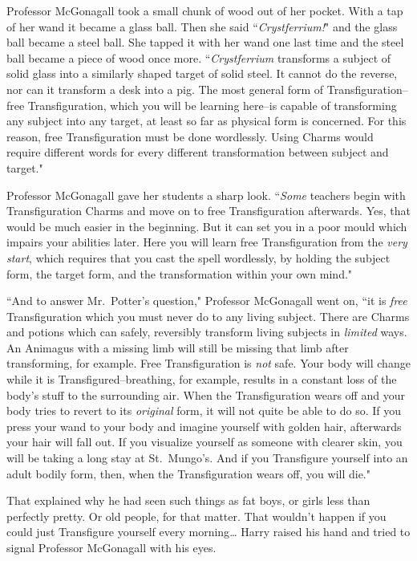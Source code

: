 Professor McGonagall took a small chunk of wood out of her pocket. With a tap of her wand it became a glass ball. Then she said ``\emph{Crystferrium!}" and the glass ball became a steel ball. She tapped it with her wand one last time and the steel ball became a piece of wood once more. ``\emph{Crystferrium} transforms a subject of solid glass into a similarly shaped target of solid steel. It cannot do the reverse, nor can it transform a desk into a pig. The most general form of Transfiguration\---free Transfiguration, which you will be learning here\---is capable of transforming any subject into any target, at least so far as physical form is concerned. For this reason, free Transfiguration must be done wordlessly. Using Charms would require different words for every different transformation between subject and target."

Professor McGonagall gave her students a sharp look. ``\emph{Some} teachers begin with Transfiguration Charms and move on to free Transfiguration afterwards. Yes, that would be much easier in the beginning. But it can set you in a poor mould which impairs your abilities later. Here you will learn free Transfiguration from the \emph{very start}, which requires that you cast the spell wordlessly, by holding the subject form, the target form, and the transformation within your own mind."

``And to answer Mr.~Potter's question," Professor McGonagall went on, ``it is \emph{free} Transfiguration which you must never do to any living subject. There are Charms and potions which can safely, reversibly transform living subjects in \emph{limited} ways. An Animagus with a missing limb will still be missing that limb after transforming, for example. Free Transfiguration is \emph{not} safe. Your body will change while it is Transfigured\---breathing, for example, results in a constant loss of the body's stuff to the surrounding air. When the Transfiguration wears off and your body tries to revert to its \emph{original} form, it will not quite be able to do so. If you press your wand to your body and imagine yourself with golden hair, afterwards your hair will fall out. If you visualize yourself as someone with clearer skin, you will be taking a long stay at St.~Mungo's. And if you Transfigure yourself into an adult bodily form, then, when the Transfiguration wears off, you will die."

That explained why he had seen such things as fat boys, or girls less than perfectly pretty. Or old people, for that matter. That wouldn't happen if you could just Transfigure yourself every morning{\ldots} Harry raised his hand and tried to signal Professor McGonagall with his eyes.

